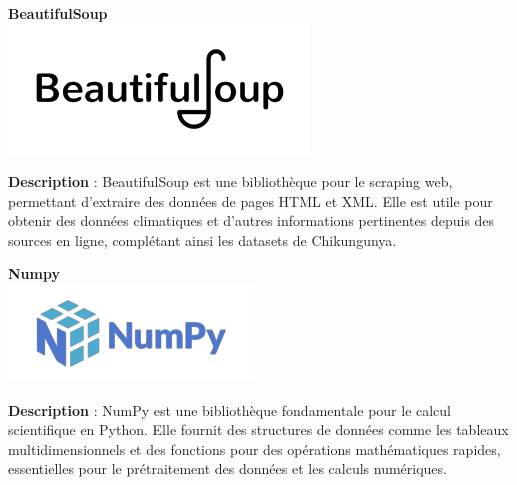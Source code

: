 \vspace{1em}
\begin{minipage}[t]{0.46\textwidth}
	\begin{center}
		\textbf{BeautifulSoup} \\
		\includegraphics[width=0.6\textwidth]{images/logobeautifulsoup} %
	\end{center}
	\textbf{Description} : BeautifulSoup est une bibliothèque pour le scraping web, permettant d'extraire des données de pages HTML et XML. Elle est utile pour obtenir des données climatiques et d'autres informations pertinentes depuis des sources en ligne, complétant ainsi les datasets de Chikungunya.
\end{minipage}
\hfill
\begin{minipage}[t]{0.46\textwidth}
	\begin{center}
		\textbf{Numpy} \\
		\includegraphics[width=0.6\linewidth]{images/logoNumpy}
	\end{center}
	\textbf{Description} : NumPy est une bibliothèque fondamentale pour le calcul scientifique en Python. Elle fournit des structures de données comme les tableaux multidimensionnels et des fonctions pour des opérations mathématiques rapides, essentielles pour le prétraitement des données et les calculs numériques.
\end{minipage}

\vspace{1em}

